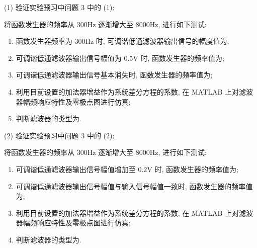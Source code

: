 \documentclass{dspreport}
\begin{document}
\begin{block}

\end{block}

(1) 验证实验预习中问题 3 中的 (1):

将函数发生器的频率从 300Hz 逐渐增大至 8000Hz, 进行如下测试:
\begin{enumerate}[label=\textcircled{\arabic*}]
    \item 函数发生器频率为 300Hz 时, 可调谐低通滤波器输出信号的幅度值为\underline{\blank{  }};
    \item 可调谐低通滤波器输出信号幅值为 0.5V 时, 函数发生器的频率值为\underline{\blank{  }};
    \item 可调谐低通滤波器输出信号基本消失时, 函数发生器的频率值为\underline{\blank{  }};
    \item 利用目前设置的加法器增益作为系统差分方程的系数, 在 MATLAB 上对滤波器幅频响应特性及零极点图进行仿真;
    \item 判断滤波器的类型为\underline{\blank{  }}.
\end{enumerate}
\begin{block}

\end{block}

\begin{figure}[H]

\end{figure}

\begin{block}

\end{block}

(2) 验证实验预习中问题 3 中的 (2):

将函数发生器的频率从 300Hz 逐渐增大至 8000Hz, 进行如下测试:
\begin{enumerate}[label=\textcircled{\arabic*}]
    \item 可调谐低通滤波器输出信号幅值增加至 0.2V 时, 函数发生器的频率值为\underline{\blank{  }};
    \item 可调谐低通滤波器输出信号幅值与输入信号幅值一致时, 函数发生器的频率值为\underline{\blank{  }};
    \item 利用目前设置的加法器增益作为系统差分方程的系数, 在 MATLAB 上对滤波器幅频响应特性及零极点图进行仿真;
    \item 判断滤波器的类型为\underline{\blank{  }}.
\end{enumerate}
\begin{block}

\end{block}
\end{document}
